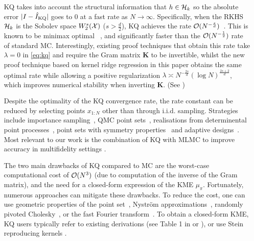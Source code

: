 KQ takes into account the structural information that $h \in \mathcal{H}_k$ so the absolute error $|I- \hat{I}_{\text{KQ}}|$ goes to $0$ at a fast rate as $N \rightarrow \infty$.
Specifically, when the RKHS $\mathcal{H}_k$ is the Sobolev space $W_2^s(\mathcal{X})$ ($s > \frac{d}{2}$), KQ achieves the rate $\mathcal{O}(N^{-\frac{s}{d}})$~\citep{Kanagawa2019adaptive,Kanagawa2017convergence}. This is known to be minimax optimal ~\citep{novak2006deterministic,novak2016some}, and significantly faster than the $\mathcal{O}(N^{-\frac{1}{2}})$ rate of standard MC. 
Interestingly, existing proof techniques that obtain this rate take $\lambda = 0$ in \eqref{eq:kq} and require the Gram matrix $\boldsymbol{K}$ to be invertible, whilst the new proof technique based on kernel ridge regression in this paper obtains the same optimal rate while allowing a positive regularization $\lambda \asymp N^{-\frac{2s}{d}}(\log N)^{\frac{2s+2}{d}}$, which improves numerical stability when inverting $\boldsymbol{K}$. (See )

Despite the optimality of the KQ convergence rate, the rate constant can be reduced by selecting points $x_{1:N}$ other than through i.i.d. sampling. Strategies include importance sampling~\citep{Bach2015,Briol2017SMCKQ}, QMC point sets~\citep{Briol2019PI,Jagadeeswaran2018,Bharti2023,Kaarnioja2025}, realisations from determinental point processes~\citep{belhadji2019kernel}, point sets with symmetry properties~\citep{Karvonen2017symmetric, Karvonen2019} and adaptive designs~\citep{osborne2012active,gunter2014sampling,Briol2015, gessner2020active}. 
Most relevant to our work is the combination of KQ with MLMC to improve accuracy in multifidelity settings \citep{li2023multilevel}.


The two main drawbacks of KQ compared to MC are the worst-case computational cost of $\mathcal{O}(N^3)$ (due to computation of the inverse of the Gram matrix), and the need for a closed-form expression of the KME $\mu_\pi$. Fortunately, numerous approaches can mitigate these drawbacks. To reduce the cost, one can use geometric properties of the point set~\citep{Karvonen2017symmetric, Karvonen2019,Kuo2024}, Nyström approximations~\citep{Hayakawa2022,Hayakawa2023}, randomly pivoted Cholesky~\citep{Epperly2023}, or the fast Fourier transform~\citep{Zeng2009}.
To obtain a closed-form KME, KQ users typically refer to existing derivations (see Table 1 in \citet{Briol2019PI} or   \citet{Wenger2021}), or use Stein reproducing kernels \citep{Oates2017,Oates2016CF2,Si2020,Sun2021}. 

